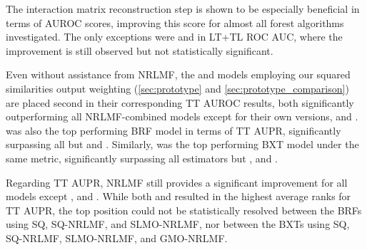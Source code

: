 The interaction matrix reconstruction step is shown to be especially beneficial in terms of AUROC scores, improving this score for almost all forest algorithms investigated. The only exceptions were  and  in LT+TL ROC AUC, where the improvement is still observed but not statistically significant.
%
%

Even without assistance from NRLMF, the  and  models employing our squared similarities output weighting (\autoref{sec:prototype} and \autoref{sec:prototype_comparison}) are placed second in their corresponding TT AUROC results, both significantly outperforming all NRLMF-combined models except for their own versions,  and . %
 was also the top performing BRF model in terms of TT AUPR, significantly surpassing all but  and .
Similarly,  was the top performing BXT model under the same metric, significantly surpassing all estimators but ,  and .

Regarding TT AUPR, NRLMF still provides a significant improvement for all models except ,  and . While both  and  resulted in the highest average ranks for TT AUPR, the top position could not be statistically resolved between the BRFs using SQ, SQ-NRLMF, and SLMO-NRLMF, nor between the BXTs using SQ, SQ-NRLMF, SLMO-NRLMF, and GMO-NRLMF.

